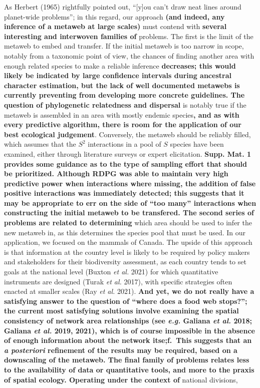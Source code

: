 \documentclass[11pt]{article}
\makeatletter
\def\maxwidth{\ifdim\Gin@nat@width>\linewidth\linewidth
\else\Gin@nat@width\fi}
\let\Oldincludegraphics\includegraphics
\renewcommand{\includegraphics}[1]{\Oldincludegraphics[width=\maxwidth]{#1}}
\providecommand{\DIFaddtex}[1]{{\bf #1}} %
\providecommand{\DIFdeltex}[1]{} %
\providecommand{\DIFaddbegin}{\protect\color{blue}} %
\providecommand{\DIFaddend}{\protect\color{black}} %
\providecommand{\DIFdelbegin}{\protect\color{red}} %
\providecommand{\DIFdelend}{\protect\color{black}} %
\providecommand{\DIFadd}[1]{\texorpdfstring{\DIFaddtex{#1}}{#1}} %
\providecommand{\DIFdel}[1]{\texorpdfstring{\DIFdeltex{#1}}{}} %
\newcommand{\DIFscaledelfig}{0.5}
\newlength{\DIFdelgraphicswidth} %
\newlength{\DIFdelgraphicsheight} %
\newcommand{\DIFaddincludegraphics}[2][]{{\color{blue}\fbox{\DIFOincludegraphics[#1]{#2}}}} %
\newcommand{\DIFdelincludegraphics}[2][]{%
\sbox{\DIFdelgraphicsbox}{\DIFOincludegraphics[#1]{#2}}%
\settoboxwidth{\DIFdelgraphicswidth}{\DIFdelgraphicsbox} %
\settoboxtotalheight{\DIFdelgraphicsheight}{\DIFdelgraphicsbox} %
\scalebox{\DIFscaledelfig}{%
\parbox[b]{\DIFdelgraphicswidth}{\usebox{\DIFdelgraphicsbox}\\[-\baselineskip] \rule{\DIFdelgraphicswidth}{0em}}\llap{\resizebox{\DIFdelgraphicswidth}{\DIFdelgraphicsheight}{%
\setlength{\unitlength}{\DIFdelgraphicswidth}%
\begin{picture}(1,1)%
\thicklines\linethickness{2pt} %
{\color[rgb]{1,0,0}\put(0,0){\framebox(1,1){}}}%
{\color[rgb]{1,0,0}\put(0,0){\line( 1,1){1}}}%
{\color[rgb]{1,0,0}\put(0,1){\line(1,-1){1}}}%
\end{picture}%
}\hspace*{3pt}}} %
} %
\DeclareRobustCommand{\DIFaddbegin}{\DIFOaddbegin \let\includegraphics\DIFaddincludegraphics} %
\DeclareRobustCommand{\DIFaddend}{\DIFOaddend \let\includegraphics\DIFOincludegraphics} %
\DeclareRobustCommand{\DIFdelbegin}{\DIFOdelbegin \let\includegraphics\DIFdelincludegraphics} %
\DeclareRobustCommand{\DIFdelend}{\DIFOaddend \let\includegraphics\DIFOincludegraphics} %
\makeatother
\begin{document}
As Herbert (1965) rightfully pointed out, ``{[}y{]}ou can't draw neat
lines around planet-wide problems''; in this regard, our approach \DIFaddbegin \DIFadd{(and
indeed, any inference of a metaweb at large scales) }\DIFaddend must contend with
\DIFdelbegin \DIFdel{two interesting }\DIFdelend \DIFaddbegin \DIFadd{several interesting and interwoven families of }\DIFaddend problems. The first is
the limit of the metaweb to embed and transfer. If the initial metaweb
is too narrow in scope, notably from a taxonomic point of view, the
chances of finding another area with enough related species to make a
reliable inference \DIFdelbegin \DIFdel{decrease. This }\DIFdelend \DIFaddbegin \DIFadd{decreases; this would likely be indicated by large
confidence intervals during ancestral character estimation, but the lack
of well documented metawebs is currently preventing from developing more
concrete guidelines. The question of phylogenetic relatedness and
dispersal }\DIFaddend is notably true if the metaweb is assembled in an area with
mostly endemic species\DIFaddbegin \DIFadd{, and as with every predictive algorithm, there is
room for the application of our best ecological judgement}\DIFaddend . Conversely,
the metaweb should be reliably filled, which assumes that the \(S^2\)
interactions in a pool of \(S\) species have been examined, either
through literature surveys or expert elicitation. \DIFdelbegin \DIFdel{The second problem is to determine }\DIFdelend \DIFaddbegin \DIFadd{Supp. Mat. 1 provides
some guidance as to the type of sampling effort that should be
prioritized. Although RDPG was able to maintain very high predictive
power when interactions where missing, the addition of false positive
interactions was immediately detected; this suggests that it may be
appropriate to err on the side of ``too many'' interactions when
constructing the initial metaweb to be transfered. The second series of
problems are related to determining }\DIFaddend which area should be used to infer
the new metaweb in, as this determines the species pool that must be
used. In our application, we focused on the mammals of Canada. The
upside of this approach is that information at the country level is
likely to be required by policy makers and stakeholders for their
biodiversity assessment, as each country tends to set goals at the
national level (Buxton \emph{et al.} 2021) for which quantitative
instruments are designed (Turak \emph{et al.} 2017), with specific
strategies often enacted at smaller scales (Ray \emph{et al.} 2021). \DIFdelbegin \DIFdel{Yet
these }\DIFdelend \DIFaddbegin \DIFadd{And
yet, we do not really have a satisfying answer to the question of
``where does a food web stops?''; the current most satisfying solutions
involve examining the spatial consistency of network area relationships
(see \emph{e.g.} Galiana \emph{et al.} 2018; Galiana \emph{et al.} 2019,
2021), which is of course impossible in the absence of enough
information about the network itse;f.~This suggests that an \emph{a
posteriori} refinement of the results may be required, based on a
downscaling of the metaweb. The final family of problems relates less to
the availability of data or quantitative tools, and more to the praxis
of spatial ecology. Operating under the context of }\DIFaddend national divisions,
\end{document}
